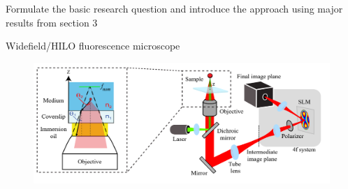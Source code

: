 \documentclass{beamer}					%
\begin{document}
\begin{frame}{}
Formulate the basic research question and introduce the approach using major results from section 3
\end{frame}

\begin{frame}{Widefield/HILO fluorescence microscope}
\begin{figure}
\includegraphics[width=13cm]{Scope.png}
\end{figure}
\end{frame}
\end{document}
